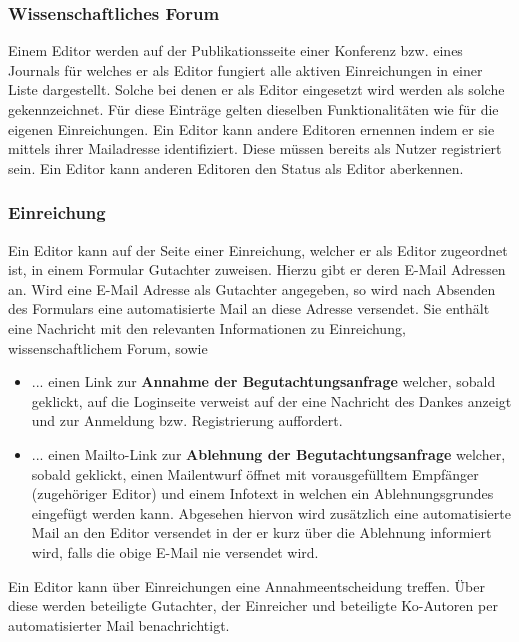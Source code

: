 \subsubsection{Wissenschaftliches Forum}
\begin{description}
     Einem Editor werden auf der Publikationsseite einer Konferenz bzw. eines Journals für
    welches er als Editor fungiert alle aktiven Einreichungen in einer Liste dargestellt.
    Solche bei denen er als Editor eingesetzt wird werden als solche gekennzeichnet.
    Für diese Einträge gelten dieselben Funktionalitäten wie für die eigenen Einreichungen. %
     Ein Editor kann andere Editoren ernennen indem er sie mittels ihrer Mailadresse identifiziert.
    Diese müssen bereits als Nutzer registriert sein.
     Ein Editor kann anderen Editoren den Status als Editor aberkennen.
\end{description}

\subsubsection{Einreichung}
\begin{description}
     Ein Editor kann auf der Seite einer Einreichung, welcher er als Editor zugeordnet ist,
    in einem Formular Gutachter zuweisen. Hierzu gibt er deren E-Mail Adressen an.
     Wird eine E-Mail Adresse als Gutachter angegeben, so wird nach Absenden des Formulars
    eine automatisierte Mail an diese Adresse versendet. Sie enthält eine Nachricht mit den relevanten
    Informationen zu Einreichung, wissenschaftlichem Forum, sowie
    \begin{itemize}
        \item ... einen Link zur \textbf{Annahme der Begutachtungsanfrage} welcher, sobald geklickt,
        auf die Loginseite verweist auf der eine Nachricht des Dankes anzeigt und zur Anmeldung bzw.
        Registrierung auffordert.
        \item ... einen Mailto-Link zur \textbf{Ablehnung der Begutachtungsanfrage} welcher, sobald
        geklickt, einen Mailentwurf öffnet mit vorausgefülltem Empfänger (zugehöriger Editor)
        und einem Infotext in welchen ein Ablehnungsgrundes eingefügt werden kann.
        Abgesehen hiervon wird zusätzlich eine automatisierte Mail an den Editor versendet in der er
        kurz über die Ablehnung informiert wird, falls die obige E-Mail nie versendet wird.
    \end{itemize}
     Ein Editor kann über Einreichungen eine Annahmeentscheidung treffen. Über diese werden
    beteiligte Gutachter, der Einreicher und beteiligte Ko-Autoren per automatisierter Mail benachrichtigt.
\end{description}


